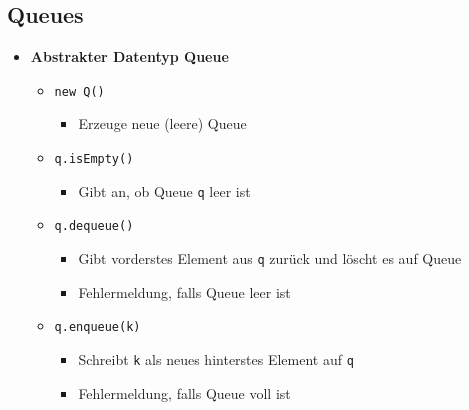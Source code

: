 \documentclass[
    12pt,
    a4paper,
    ngerman,
    color=3b,%
    marginpar=false,
    colorback=false,
    leqno,
]{tudaexercise}
\begin{document}
\subsection{Queues}\label{Queues}
\begin{itemize}
    \item \textbf{Abstrakter Datentyp Queue}
          \begin{itemize}
              \item \texttt{new Q()}
                    \begin{itemize}
                        \item Erzeuge neue (leere) Queue
                    \end{itemize}

              \item \texttt{q.isEmpty()}
                    \begin{itemize}
                        \item Gibt an, ob Queue \texttt{q} leer ist
                    \end{itemize}

              \item \texttt{q.dequeue()}
                    \begin{itemize}
                        \item Gibt vorderstes Element aus \texttt{q} zurück und löscht es auf Queue
                        \item Fehlermeldung, falls Queue leer ist
                    \end{itemize}

              \item \texttt{q.enqueue(k)}
                    \begin{itemize}
                        \item Schreibt \texttt{k} als neues hinterstes Element auf \texttt{q}
                        \item Fehlermeldung, falls Queue voll ist
                    \end{itemize}


\end{itemize}
\end{itemize}
\end{document}
